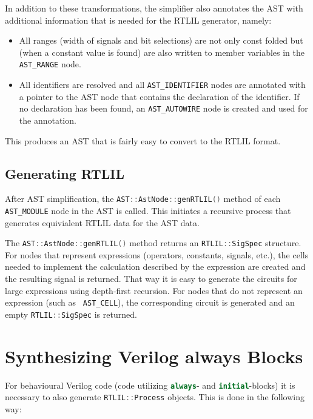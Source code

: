 In addition to these transformations, the simplifier also annotates the AST with additional information that is needed
for the RTLIL generator, namely:

\begin{itemize}
\item All ranges (width of signals and bit selections) are not only const folded but (when a constant value
is found) are also written to member variables in the {\tt AST\_RANGE} node.
\item All identifiers are resolved and all {\tt AST\_IDENTIFIER} nodes are annotated with a pointer to the AST node
that contains the declaration of the identifier. If no declaration has been found, an {\tt AST\_AUTOWIRE} node
is created and used for the annotation.
\end{itemize}

This produces an AST that is fairly easy to convert to the RTLIL format.

\subsection{Generating RTLIL}

After AST simplification, the \lstinline[language=C++]{AST::AstNode::genRTLIL()} method of each {\tt AST\_MODULE} node
in the AST is called. This initiates a recursive process that generates equivialent RTLIL data for the AST data.

The \lstinline[language=C++]{AST::AstNode::genRTLIL()} method returns an \lstinline[language=C++]{RTLIL::SigSpec} structure.
For nodes that represent expressions (operators, constants, signals, etc.), the cells needed to implement the calculation
described by the expression are created and the resulting signal is returned. That way it is easy to generate the circuits
for large expressions using depth-first recursion. For nodes that do not represent an expression (such as {\tt
AST\_CELL}), the corresponding circuit is generated and an empty \lstinline[language=C++]{RTLIL::SigSpec} is returned.

\section{Synthesizing Verilog always Blocks}

For behavioural Verilog code (code utilizing \lstinline[language=Verilog]{always}- and
\lstinline[language=Verilog]{initial}-blocks) it is necessary to also generate \lstinline[language=C++]{RTLIL::Process}
objects. This is done in the following way:

